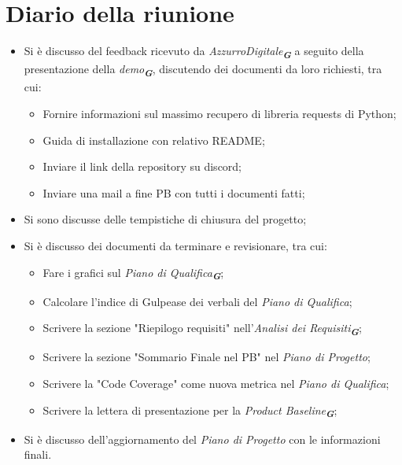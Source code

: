 
\section{Diario della riunione}

\begin{itemize}
    \item Si è discusso del feedback ricevuto da \emph{AzzurroDigitale}\textsubscript{\textit{\textbf{G}}} a seguito della presentazione della \emph{demo}\textsubscript{\textit{\textbf{G}}}, discutendo dei documenti da loro richiesti, tra cui:  
        \begin{itemize}
            \item Fornire informazioni sul massimo recupero di libreria requests di Python;
            \item Guida di installazione con relativo README;
            \item Inviare il link della repository su discord;
            \item Inviare una mail a fine PB con tutti i documenti fatti;
        \end{itemize}

    \item Si sono discusse delle tempistiche di chiusura del progetto; 
    
    \item Si è discusso dei documenti da terminare e revisionare, tra cui:
        \begin{itemize}
            \item Fare i grafici sul \emph{Piano di Qualifica}\textsubscript{\textit{\textbf{G}}};
            \item Calcolare l'indice di Gulpease dei verbali del \emph{Piano di Qualifica};
            \item Scrivere la sezione "Riepilogo requisiti" nell'\emph{Analisi dei Requisiti}\textsubscript{\textit{\textbf{G}}};
            \item Scrivere la sezione "Sommario Finale nel PB" nel \emph{Piano di Progetto};
            \item Scrivere la "Code Coverage" come nuova metrica nel \emph{Piano di Qualifica};
            \item Scrivere la lettera di presentazione per la \emph{Product Baseline}\textsubscript{\textit{\textbf{G}}};
        \end{itemize}
    
        \item Si è discusso dell'aggiornamento del \emph{Piano di Progetto} con le informazioni finali.
    
\end{itemize}
